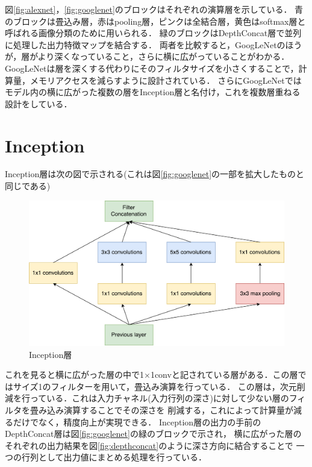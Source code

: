 {図\ref{fig:alexnet}，\ref{fig:googlenet}のブロックはそれぞれの演算層を示している．
青のブロックは畳込み層，赤はpooling層，ピンクは全結合層，黄色はsoftmax層と呼ばれる画像分類のために用いられる．
緑のブロックはDepthConcat層で並列に処理した出力特徴マップを結合する．
両者を比較すると，GoogLeNetのほうが，層がより深くなっていること，さらに横に広がっていることがわかる．
GoogLeNetは層を深くする代わりにそのフィルタサイズを小さくすることで，計算量，メモリアクセスを減らすように設計されている．
さらにGoogLeNetではモデル内の横に広がった複数の層をInception層と名付け，これを複数層重ねる設計をしている．

\section{Inception}
\label{sec:inception}
Inception層は次の図で示される(これは図\ref{fig:googlenet}の一部を拡大したものと同じである)

\begin{figure}[h]
  \centering
  \includegraphics[scale=0．5]{./chap2/fig/inception.pdf}
  \caption{Inception層}
  \label{fig:inception}
\end{figure}

これを見ると横に広がった層の中で1$\times$1convと記されている層がある．この層ではサイズ1のフィルターを用いて，畳込み演算を行っている．
この層は，次元削減を行っている．これは入力チャネル(入力行列の深さ)に対して少ない層のフィルタを畳み込み演算することでその深さを
削減する，これによって計算量が減るだけでなく，精度向上が実現できる．
Inception層の出力の手前のDepthConcat層は図\ref{fig:googlenet}の緑のブロックで示され，
横に広がった層のそれぞれの出力結果を図\ref{fig:depthconcat}のように深さ方向に結合することで
一つの行列として出力値にまとめる処理を行っている．

}
